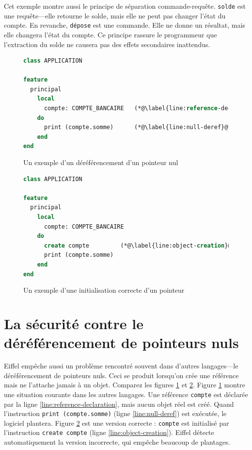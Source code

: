 \documentclass[french]{report}
\begin{document}
Cet exemple montre aussi le principe de séparation commande-requête. \texttt{solde} est une requête---elle retourne le solde, mais elle ne peut pas changer l'état du compte. En revanche, \texttt{dépose} est une commande. Elle ne donne un résultat, mais elle changera l'état du compte. Ce principe rassure le programmeur que l'extraction du solde ne causera pas des effets secondaires inattendus.

\begin{figure}[h]
	\begin{lstlisting}[language=Eiffel]
class APPLICATION

feature
  principal
    local
      compte: COMPTE_BANCAIRE 	(*@\label{line:reference-declaration}@*)
    do
      print (compte.somme)		(*@\label{line:null-deref}@*)
    end
end
	\end{lstlisting}
	
	\caption{Un exemple d'un déréférencement d'un pointeur nul}
	\label{fig:null-deref-condition}
\end{figure}

\begin{figure}[h]
	\begin{lstlisting}[language=Eiffel]
class APPLICATION
	
feature
  principal
    local
      compte: COMPTE_BANCAIRE
    do
      create compte 		(*@\label{line:object-creation}@*)
      print (compte.somme) 	
    end
end
	\end{lstlisting}
	
	\caption{Un exemple d'une initialisation correcte d'un pointeur}
	\label{fig:nonnull-deref-condition}
\end{figure}

\section{La sécurité contre le déréférencement de pointeurs nuls}

Eiffel empêche aussi un problème rencontré souvent dans d'autres langages---le déréférencement de pointeurs nuls. Ceci se produit lorsqu'on crée une référence mais ne l'attache jamais à un objet. Comparez les figures \ref{fig:null-deref-condition} et \ref{fig:nonnull-deref-condition}. Figure \ref{fig:null-deref-condition} montre une situation courante dans les autres langages. Une référence \texttt{compte} est déclarée par la ligne \ref{line:reference-declaration}, mais aucun objet réel est créé. Quand l'instruction \texttt{print (compte.somme)} (ligne \ref{line:null-deref}) est exécutée, le logiciel plantera. Figure \ref{fig:nonnull-deref-condition} est une version correcte : \texttt{compte} est initialisé par l'instruction \texttt{create compte} (ligne \ref{line:object-creation}). Eiffel détecte automatiquement la version incorrecte, qui empêche beaucoup de plantages.
\end{document}
